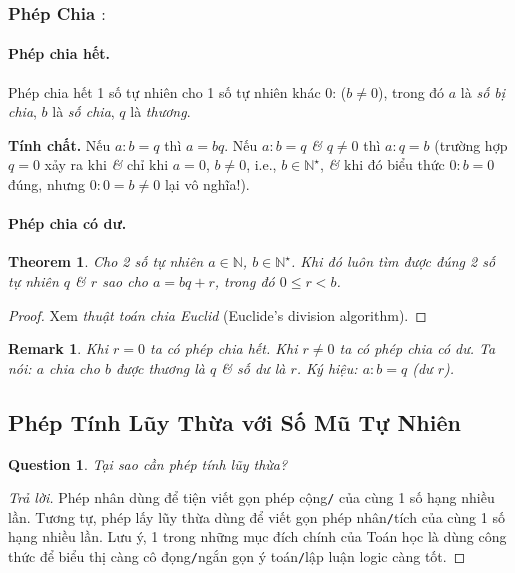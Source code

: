\documentclass{article}
\numberwithin{equation}{section}
\newtheorem{question}{Question}[section]
\newtheorem{remark}{Remark}[section]
\newtheorem{theorem}{Theorem}[section]
\begin{document}
\subsubsection{Phép Chia $:$}

\paragraph{Phép chia hết.} Phép chia hết 1 số tự nhiên cho 1 số tự nhiên khác 0:  ($b\ne 0$), trong đó $a$ là \textit{số bị chia}, $b$ là \textit{số chia}, $q$ là \textit{thương}.

\noindent\textbf{Tính chất.} Nếu $a:b = q$ thì $a = bq$. Nếu $a:b = q$ \textit{\&} $q\ne 0$ thì $a:q = b$ (trường hợp $q = 0$ xảy ra khi \textit{\&} chỉ khi $a = 0$, $b\ne 0$, i.e., $b\in\mathbb{N}^\star$, \textit{\&} khi đó biểu thức $0:b = 0$ đúng, nhưng $0:0 = b\ne 0$ lại vô nghĩa!).

\paragraph{Phép chia có dư.}
\begin{theorem}
	Cho 2 số tự nhiên $a\in\mathbb{N}$, $b\in\mathbb{N}^\star$. Khi đó luôn tìm được đúng 2 số tự nhiên $q$ \textit{\&} $r$ sao cho $a = bq + r$, trong đó $0\le r < b$.
\end{theorem}

\begin{proof}[Proof]
	Xem \textit{thuật toán chia Euclid} (Euclide's division algorithm).
\end{proof}

\begin{remark}
	Khi $r = 0$ ta có phép chia hết. Khi $r\ne 0$ ta có phép chia có dư. Ta nói: $a$ chia cho $b$ được thương là $q$ \textit{\&} số dư là $r$. Ký hiệu: $a:b = q$ (dư $r$).
\end{remark}

\subsection{Phép Tính Lũy Thừa với Số Mũ Tự Nhiên}

\begin{question}
	Tại sao cần phép tính lũy thừa?
\end{question}

\begin{proof}[Trả lời]
	Phép nhân dùng để tiện viết gọn phép cộng\texttt{/} của cùng 1 số hạng nhiều lần. Tương tự, phép lấy lũy thừa dùng để viết gọn phép nhân\texttt{/}tích của cùng 1 số hạng nhiều lần. Lưu ý, 1 trong những mục đích chính của Toán học là dùng công thức để biểu thị càng cô đọng\texttt{/}ngắn gọn ý toán\texttt{/}lập luận logic càng tốt.
\end{proof}
\end{document}
